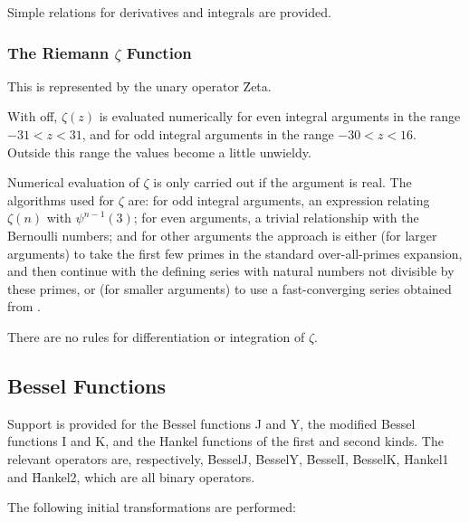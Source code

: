Simple relations for derivatives and integrals are provided.


\subsubsection{The Riemann $\zeta$ Function}

This is represented by the unary operator \f{Zeta}.

With  off, $\zeta(z)$ is evaluated numerically for even
integral arguments in the range $-31 < z < 31$, and for odd integral
arguments in the range $-30 < z < 16$.  Outside this range the values
become a little unwieldy.

Numerical evaluation of $\zeta$ is only carried out if the argument is real.
The algorithms used for $\zeta$ are: for odd integral arguments, an
expression relating $\zeta(n)$ with $\psi^{n-1}(3)$; for even arguments, a
trivial relationship with the Bernoulli numbers; and for other arguments the
approach is either (for larger arguments) to take the first few primes in
the standard over-all-primes expansion, and then continue with the defining
series with natural numbers not divisible by these primes, or (for smaller
arguments) to use a fast-converging series obtained from \cite{BenderOrszag:78}.

There are no rules for differentiation or integration of $\zeta$.


\subsection{Bessel Functions}

Support is provided for the Bessel functions J and Y, the modified
Bessel functions I and K, and the Hankel functions of the first and
second kinds.  The relevant operators are, respectively, \f{BesselJ},
\f{BesselY}, \f{BesselI}, \f{BesselK}, \f{Hankel1} and \f{Hankel2}, 
which are all binary operators.

The following initial transformations are performed:


